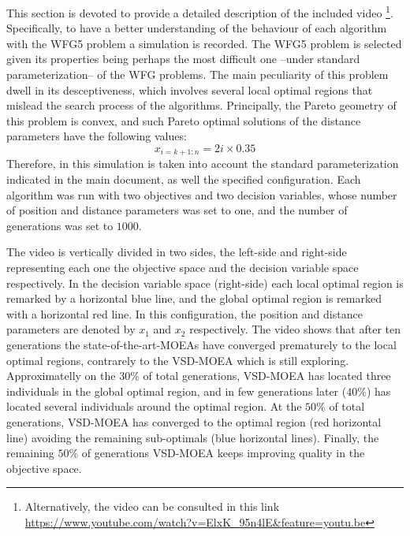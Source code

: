 This section is devoted to provide a detailed description of the included video \footnote{Alternatively, the video can be consulted in this link \url{https://www.youtube.com/watch?v=ElxK_95n4lE&feature=youtu.be}}.
%
Specifically, to have a better understanding of the behaviour of each algorithm with the WFG5 problem a simulation is recorded.
%
The WFG5 problem is selected given its properties being perhaps the most difficult one --under standard parameterization-- of the WFG problems.
%
The main peculiarity of this problem dwell in its desceptiveness, which involves several local optimal regions that mislead the search process of the algorithms.
%
Principally, the Pareto geometry of this problem is convex, and such Pareto optimal solutions of the distance parameters have the following values:
%
\begin{equation}
   x_{i=k+1:n} = 2i \times 0.35
\end{equation}
Therefore, in this simulation is taken into account the standard parameterization indicated in the main document, as well the specified configuration.
%
Each algorithm was run with two objectives and two decision variables, whose number of position and distance parameters was set to one, and the number of generations was set to $1000$.
%

The video is vertically divided in two sides, the left-side and right-side representing each one the objective space and the decision variable space respectively.
%
In the decision variable space (right-side) each local optimal region is remarked by a horizontal blue line, and the global optimal region is remarked with a horizontal red line.
%
In this configuration, the position and distance parameters are denoted by $x_1$ and $x_2$ respectively.
%
The video shows that after ten generations the state-of-the-art-MOEAs have converged prematurely to the local optimal regions, contrarely to the VSD-MOEA which is still exploring.
%
Approximatelly on the $30\%$ of total generations, VSD-MOEA has located three individuals in the global optimal region, and in few generations later ($40\%$) has located several individuals around the optimal region.
%
At the $50\%$ of total generations, VSD-MOEA has converged to the optimal region (red horizontal line) avoiding the remaining sub-optimals (blue horizontal lines).
%
Finally, the remaining $50\%$ of generations VSD-MOEA keeps improving quality in the objective space.

